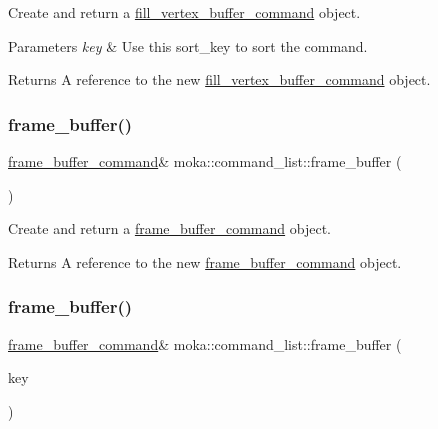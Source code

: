 Create and return a \mbox{\hyperlink{classmoka_1_1fill__vertex__buffer__command}{fill\+\_\+vertex\+\_\+buffer\+\_\+command}} object. 


\begin{DoxyParams}{Parameters}
{\em key} & Use this sort\+\_\+key to sort the command. \\
\hline
\end{DoxyParams}
\begin{DoxyReturn}{Returns}
A reference to the new \mbox{\hyperlink{classmoka_1_1fill__vertex__buffer__command}{fill\+\_\+vertex\+\_\+buffer\+\_\+command}} object. 
\end{DoxyReturn}
\mbox{\label{classmoka_1_1command__list_a2c25cc351ff4ed1b62ab37820d534352}} 
\subsubsection{\texorpdfstring{frame\_buffer()}{frame\_buffer()}\hspace{0.1cm}{\footnotesize\ttfamily [1/2]}}
{\footnotesize\ttfamily \mbox{\hyperlink{classmoka_1_1frame__buffer__command}{frame\+\_\+buffer\+\_\+command}}\& moka\+::command\+\_\+list\+::frame\+\_\+buffer (\begin{DoxyParamCaption}{ }\end{DoxyParamCaption})}



Create and return a \mbox{\hyperlink{classmoka_1_1frame__buffer__command}{frame\+\_\+buffer\+\_\+command}} object. 

\begin{DoxyReturn}{Returns}
A reference to the new \mbox{\hyperlink{classmoka_1_1frame__buffer__command}{frame\+\_\+buffer\+\_\+command}} object. 
\end{DoxyReturn}
\mbox{\label{classmoka_1_1command__list_ae9b5c5bdd4aa13fc55ae20b3afb6265b}} 
\subsubsection{\texorpdfstring{frame\_buffer()}{frame\_buffer()}\hspace{0.1cm}{\footnotesize\ttfamily [2/2]}}
{\footnotesize\ttfamily \mbox{\hyperlink{classmoka_1_1frame__buffer__command}{frame\+\_\+buffer\+\_\+command}}\& moka\+::command\+\_\+list\+::frame\+\_\+buffer (\begin{DoxyParamCaption}\item[{\mbox{\hyperlink{namespacemoka_afa30a616e67b83113ebdb857555cf2bb}{sort\+\_\+key}}}]{key }\end{DoxyParamCaption})}



